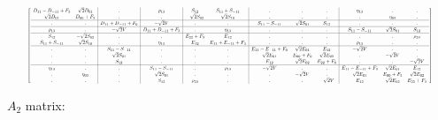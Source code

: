 \documentclass{article}
\begin{document}
\begin{equation*}
\resizebox{.95 \textwidth}{!}
{$
\left[
\begin{array}{cc|c|c|cc|ccc|ccc}
	D_{11} -  D_{-11} +  F_{3} & \sqrt{2}D_{01} &.&  \rho_{13} &  S_{12} &  S_{11} +  S_{-11} &.&.&.&  \eta_{13} &.&.\\
	\sqrt{2}D_{01} &  D_{00} +  F_{3} &.&.&  - \sqrt{2}S_{02} & \sqrt{2}S_{10} &.&.&.&.&\eta_{03}&.\\
	\hline
	.&.&  D_{11} +  D_{-11} +  F_{0} &  - \sqrt{2}V &.&.&  S_{11} -  S_{-11} & \sqrt{2}S_{01} &  S_{12} &.&.&.\\
	\hline
	\rho_{13} &.&  - \sqrt{2}V &  D_{11} +  D_{-11} +  F_{3} &.&  \eta_{13} &.&.&.&  S_{11} -  S_{-11} & \sqrt{2}S_{01} &  S_{12} \\
	\hline
	S_{12} &  - \sqrt{2}S_{02} &.&.&  E_{22} +  F_{3} &  E_{12} &.&.&.&.&.&  \rho_{23} \\
	S_{11} +  S_{-11} & \sqrt{2}S_{10} &.&  \eta_{13} &  E_{12} &  E_{11} +  E_{-11} +  F_{3} &.&.&.&  \rho_{13} &.&.\\
	\hline
	.&.&  S_{11} -  S_{-11} &.&.&.&  E_{11} -  E_{-11} +  F_{0} & \sqrt{2}E_{01} &  E_{12} &  - \sqrt{2}V &.&.\\
	.&.& \sqrt{2}S_{01} &.&.&.& \sqrt{2}E_{01} & E_{00} + F_{0} & \sqrt{2}E_{02} &.&  - \sqrt{2}V &.\\
	.&.&  S_{12} &.&.&.&  E_{12} & \sqrt{2}E_{02} &  E_{22} +  F_{0} &.&.&  - \sqrt{2}V \\
	\hline
	\eta_{13} &.&.&  S_{11} -  S_{-11} &.&  \rho_{13} &  - \sqrt{2}V &.&.&  E_{11} -  E_{-11} +  F_{3} & \sqrt{2}E_{01} &  E_{12} \\
	.&\eta_{03}&.& \sqrt{2}S_{01} &.&.&.&  - \sqrt{2}V &.& \sqrt{2}E_{01} &  E_{00} +  F_{3} & \sqrt{2}E_{02} \\
	.&.&.&  S_{12} &  \rho_{23} &.&.&.&  - \sqrt{2}V &  E_{12} & \sqrt{2}E_{02} &  E_{22} +  F_{3} \\
\end{array}
\right]
$}
\end{equation*}

$A_{2}$ matrix:
\end{document}
